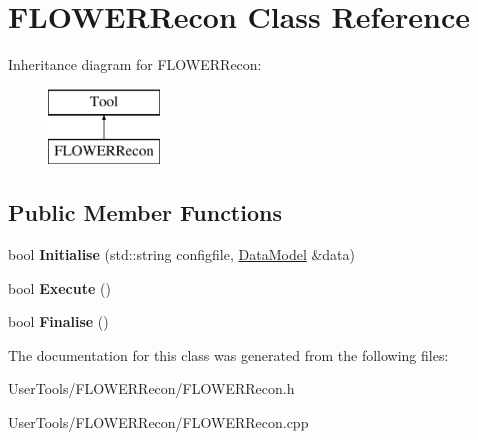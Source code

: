 \hypertarget{classFLOWERRecon}{\section{F\-L\-O\-W\-E\-R\-Recon Class Reference}
\label{classFLOWERRecon}
}
Inheritance diagram for F\-L\-O\-W\-E\-R\-Recon\-:\begin{figure}[H]
\begin{center}
\leavevmode
\includegraphics[height=2.000000cm]{classFLOWERRecon}
\end{center}
\end{figure}
\subsection*{Public Member Functions}
\begin{DoxyCompactItemize}
\item 
\hypertarget{classFLOWERRecon_a22d738c5f0d82306add530ae62613037}{bool {\bfseries Initialise} (std\-::string configfile, \hyperlink{classDataModel}{Data\-Model} \&data)}\label{classFLOWERRecon_a22d738c5f0d82306add530ae62613037}

\item 
\hypertarget{classFLOWERRecon_aafaf4c8c221737d6d5b984cee909f4e4}{bool {\bfseries Execute} ()}\label{classFLOWERRecon_aafaf4c8c221737d6d5b984cee909f4e4}

\item 
\hypertarget{classFLOWERRecon_a9e1c79216a6c4a9ab0025a3f5f55bb83}{bool {\bfseries Finalise} ()}\label{classFLOWERRecon_a9e1c79216a6c4a9ab0025a3f5f55bb83}

\end{DoxyCompactItemize}


The documentation for this class was generated from the following files\-:\begin{DoxyCompactItemize}
\item 
User\-Tools/\-F\-L\-O\-W\-E\-R\-Recon/F\-L\-O\-W\-E\-R\-Recon.\-h\item 
User\-Tools/\-F\-L\-O\-W\-E\-R\-Recon/F\-L\-O\-W\-E\-R\-Recon.\-cpp\end{DoxyCompactItemize}
